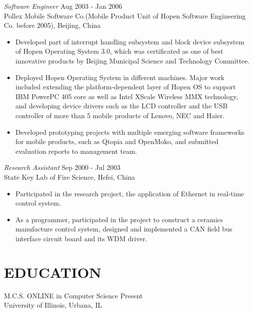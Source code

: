 \documentclass[line,margin]{res}
\begin{document}
\begin{resume}
                {\sl Software Engineer} \hfill                  Aug 2003 - Jan 2006 \\
                Pollex Mobile Software Co.(Mobile Product
                Unit of Hopen Software Engineering Co. before 2005), Beijing, China

                 \begin{itemize}  %
                 \item Developed part of interrupt handling subsystem and block device
                   subsystem of Hopen Operating System 3.0, which was certificated as one of best
                   innovative products by Beijing Municipal Science and Technology Committee.
                 \item Deployed Hopen Operating System in different machines. Major work included
                   extending the platform-dependent layer of Hopen OS to support IBM PowerPC 405
                   core as well as Intel XScale Wireless MMX technology, and developing device
                   drivers such as the LCD controller and the USB controller of more than 5 mobile
                   products of Lenovo, NEC and Haier.
                 \item Developed prototyping projects with multiple emerging software frameworks
                   for mobile products, such as Qtopia and OpenMoko, and submitted evaluation 
                   reports to management team.
                 \end{itemize}
                {\sl Research Assistant} \hfill                 Sep 2000 - Jul 2003 \\
                State Key Lab of Fire Science, Hefei, China

                  \begin{itemize}
                  \item Participated in the research project, the application of Ethernet in real-time
                    control system. 
                   \item As a programmer, participated in the project to construct a ceramics
                     manufacture control system, designed and implemented a CAN field bus interface
                     circuit board and its WDM driver.
                   \end{itemize} 
 
\section{EDUCATION} {\sl}
                M.C.S. ONLINE in Computer Science \hfill Present\\
                University of Illinois, Urbana, IL


\end{resume}
\end{document}
